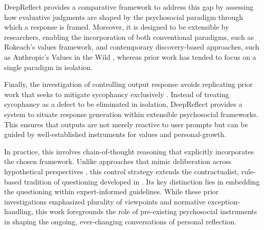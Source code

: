 DeepReflect provides a comparative framework to address this gap by assessing how evaluative judgments are shaped by the psychosocial paradigm through which a response is framed. 
Moreover, it is designed to be extensible by researchers, enabling the incorporation of both conventional paradigms, such as Rokeach’s values framework, and contemporary discovery-based approaches, such as Anthropic’s Values in the Wild \cite{values-in-wild}, whereas prior work has tended to focus on a single paradigm in isolation.

\medskip Finally, the investigation of controlling output response avoids replicating prior work that seeks to mitigate sycophancy exclusively \cite{cheng-etal-sycophancy}. Instead of treating sycophancy as a defect to be eliminated in isolation, DeepReflect provides a system to situate response generation within extensible psychosocial frameworks. This ensures that outputs are not merely reactive to user prompts but can be guided by well-established instruments for values and personal-growth. 


In practice, this involves chain-of-thought reasoning \cite{cot} that explicitly incorporates the chosen framework. Unlike approaches that mimic deliberation across hypothetical perspectives \cite{socialgaze}, this control strategy extends the contractualist, rule-based tradition of questioning developed in \cite{cot-morals}. Its key distinction lies in embedding the questioning within expert-informed guidelines. While these prior investigations emphasized plurality of viewpoints and normative exception-handling, this work foregrounds the role of pre-existing psychosocial instruments in shaping the ongoing, ever-changing conversations of personal reflection.

